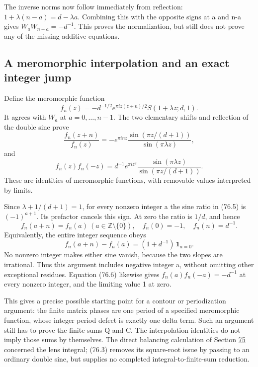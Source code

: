 \documentclass[11pt,reqno]{amsart}
\theoremstyle{plain}
\begin{document}
The inverse norms now follow immediately from reflection:
\(1+\lambda(n-a)=d-\lambda a\). Combining this with the opposite
signs at a and n-a gives \(W_aW_{n-a}=-d^{-1}\). This proves the
normalization, but still does not prove any of the missing additive
equations.

\subsection{A meromorphic interpolation and an exact integer jump}\label{sec:76.3}

Define the meromorphic function
\[
 f_n(z)=-d^{-1/2}e^{\pi i z(z+n)/2}S(1+\lambda z;d,1).
\]
It agrees with \(W_a\) at \(a=0,\ldots,n-1\). The two elementary
shifts and reflection of the double sine prove
\begin{equation*}
 \boxed{\displaystyle
 \frac{f_n(z+n)}{f_n(z)}
 =-e^{\pi i n z}
   \frac{\sin(\pi z/(d+1))}{\sin(\pi\lambda z)},}
 \tag{76.5}
\end{equation*}
and
\begin{equation*}
 \boxed{\displaystyle
 f_n(z)f_n(-z)
 =d^{-1}e^{\pi i z^2}
   \frac{\sin(\pi\lambda z)}{\sin(\pi z/(d+1))}.}
 \tag{76.6}
\end{equation*}
These are identities of meromorphic functions, with removable values
interpreted by limits.

Since \(\lambda+1/(d+1)=1\), for every nonzero integer a the sine
ratio in (76.5) is \((-1)^{a+1}\). Its prefactor cancels this sign.
At zero the ratio is \(1/d\), and hence
\[
 f_n(a+n)=f_n(a)\ (a\in\mathbb Z\setminus\{0\}),\quad
 f_n(0)=-1,\quad f_n(n)=d^{-1}.
\]
Equivalently, the entire integer sequence obeys
\begin{equation*}
 \boxed{\displaystyle
 f_n(a+n)-f_n(a)=(1+d^{-1})\,\mathbf1_{a=0}.}
 \tag{76.7}
\end{equation*}
No nonzero integer makes either sine vanish, because the two slopes are
irrational. Thus this argument includes negative integer a, without
omitting other exceptional residues. Equation (76.6) likewise gives
\(f_n(a)f_n(-a)=-d^{-1}\) at every nonzero integer, and the limiting
value 1 at zero.

This gives a precise possible starting point for a contour or
periodization argument: the finite matrix phases are one period of a
specified meromorphic function, whose integer period defect is exactly
one delta term. Such an argument still has to prove the finite sums Q
and C. The interpolation identities do not imply those sums by
themselves. The direct balancing calculation of Section \hyperref[sec:75]{75} concerned
the lens integral; (76.3) removes its square-root issue by passing to an
ordinary double sine, but supplies no completed integral-to-finite-sum
reduction.
\end{document}
